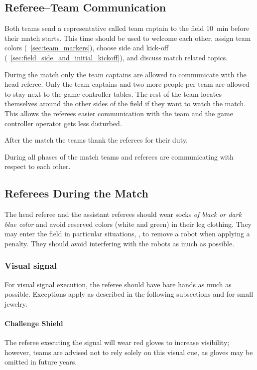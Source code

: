 \subsection{Referee--Team Communication}
\label{sec:referee_team_communication}

Both teams send a representative called team captain to the field \qty{10}{\minute} before their match starts.
This time should be used to welcome each other, assign team colors (\cf~\cref{sec:team_markers}), choose side and kick-off (\cf~\cref{sec:field_side_and_initial_kickoff}), and discuss match related topics.

During the match only the team captains are allowed to communicate with the head referee.
Only the team captains and two more people per team are allowed to stay next to the game controller tables.
The rest of the team locates themselves around the other sides of the field if they want to watch the match.
This allows the referees easier communication with the team and the game controller operator gets less disturbed.

After the match the teams thank the referees for their duty.

During all phases of the match teams and referees are communicating with respect to each other.

\subsection{Referees During the Match}

The head referee and the assistant referees should wear socks \emph{of black or dark blue color} and avoid reserved colors (white and green) in their leg clothing.
They may enter the field in particular situations, \eg, to remove a robot when applying a penalty.
They should avoid interfering with the robots as much as possible.

\subsubsection{Visual signal}

For visual signal execution, the referee should have bare hands as much as possible.
Exceptions apply as described in the following subsections and for small jewelry.

\paragraph{Challenge Shield}

The referee executing the signal will wear red gloves to increase visibility; however, teams are advised not to rely solely on this visual cue, as gloves may be omitted in future years.
